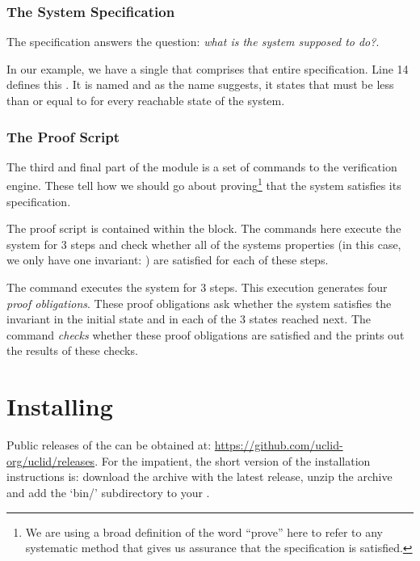 \subsubsection{The System Specification}
The specification answers the question: \emph{what is the system supposed to do?}. 

In our example, we have a single  that comprises that entire specification. Line 14 defines this . It is named  and as the name suggests, it states that  must be less than or equal to  for every reachable state of the system.

\subsubsection{The Proof Script}
The third and final part of the \uclid{} module is a set of commands to the \uclid{} verification engine. These tell how we should go about proving\footnote{We are using a broad definition of the word ``prove'' here to refer to any systematic method that gives us assurance that the specification is satisfied.} that the system satisfies its specification.

The proof script is contained within the  block. The commands here execute the system for 3 steps and check whether all of the systems properties (in this case, we only have one invariant: ) are satisfied for each of these steps. 

The command  executes the system for 3 steps. This execution generates four \emph{proof obligations}. These proof obligations ask whether the system satisfies the invariant  in the initial state and in each of the 3 states reached next. The  command \emph{checks} whether these proof obligations are satisfied and the  prints out the results of these checks.

\section{Installing \uclid{}}

Public releases of the \uclid{} can be obtained at: \url{https://github.com/uclid-org/uclid/releases}. For the impatient, the short version of the installation instructions is: download the archive with the latest release, unzip the archive and add the `bin/' subdirectory to your . 

